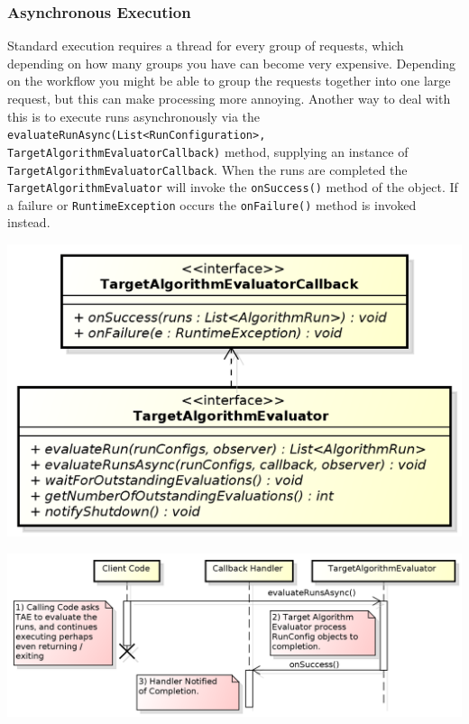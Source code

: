 \documentclass[11pt,letterpaper,oneside]{article}
\begin{document}
\subsubsection{Asynchronous Execution}

Standard execution requires a thread for every group of requests, which depending on how many groups you have can become very expensive. Depending on the workflow you might be able to group the requests together into one large request, but this can make processing more annoying. Another way to deal with this is to execute runs asynchronously via the  \texttt{evaluateRunAsync(List<RunConfiguration>,\\
 TargetAlgorithmEvaluatorCallback)} method, supplying an instance of \\ \texttt{TargetAlgorithmEvaluatorCallback}. When the runs are completed the \texttt{TargetAlgorithmEvaluator} will invoke the \texttt{onSuccess()} method of the object. If a failure or \texttt{RuntimeException} occurs the \texttt{onFailure()} method is invoked instead.

\begin{center}
\includegraphics[scale=0.75]{img/UML/TAECallback.png}
\end{center}



\begin{center}
\includegraphics[scale=0.75]{img/UML/TAESequence2.png}
\end{center}
\end{document}
